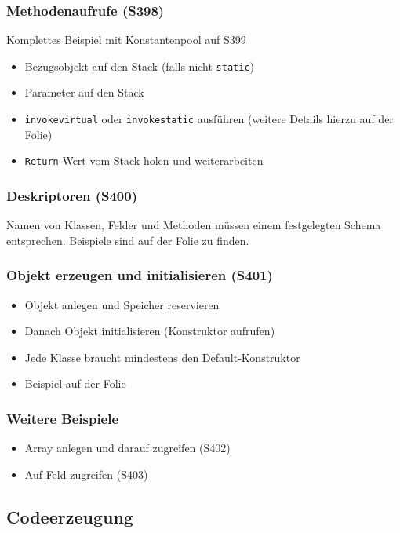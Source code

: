 \subsubsection{Methodenaufrufe (S398)}
Komplettes Beispiel mit Konstantenpool auf S399
\begin{itemize}
	\item Bezugsobjekt auf den Stack (falls nicht \texttt{static})
	\item Parameter auf den Stack
	\item \texttt{invokevirtual} oder \texttt{invokestatic} ausführen (weitere Details hierzu auf der Folie)
	\item \texttt{Return}-Wert vom Stack holen und weiterarbeiten
\end{itemize}

\subsubsection{Deskriptoren (S400)}
Namen von Klassen, Felder und Methoden müssen einem festgelegten Schema entsprechen. Beispiele sind auf der Folie zu finden.

\subsubsection{Objekt erzeugen und initialisieren (S401)}
\begin{itemize}
	\item Objekt anlegen und Speicher reservieren
	\item Danach Objekt initialisieren (Konstruktor aufrufen)
	\item Jede Klasse braucht mindestens den Default-Konstruktor
	\item Beispiel auf der Folie
\end{itemize}

\subsubsection{Weitere Beispiele}
\begin{itemize}
	\item Array anlegen und darauf zugreifen (S402)
	\item Auf Feld zugreifen (S403)
\end{itemize}


\subsection{Codeerzeugung}

